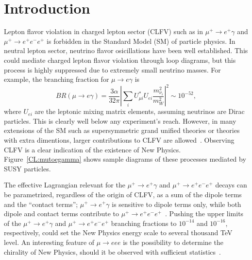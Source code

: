 \section{Introduction}

Lepton flavor violation in charged lepton sector (CLFV) such as in 
$\mu^+\to e^+\gamma$ and $\mu^+\to e^+e^-e^+$ is forbidden in
the Standard Model (SM) of particle physics. In neutral lepton sector,
neutrino flavor osicillations have been well established. This could 
mediate charged lepton flavor violation through loop diagrams, but this
process is highly suppressed due to extremely small neutrino masses. 
For example, the branching fraction for
$\mu \to e \gamma$ is~\cite{}
\begin{equation}
BR(\mu \rightarrow e \gamma)=\frac{3\alpha}{32\pi}\left|\sum_i U_{\mu
i}^* U_{e i}\frac{m_{\nu_{i}}^2}{m_{W}^2}\right|^2 \sim 10^{-52},
\end{equation}
where $U_{ei}$ are the leptonic mixing matrix elements, assuming neutrinos
are Dirac particles. This is clearly well below any experiment's reach.
However, in many extensions of the SM such as supersymmetric grand unified
theories or theories with extra dimentions, larger contributions to CLFV are
allowed~\cite{new physics}. Observing CLFV is a clear indication of the 
existence of New Physics. Figure~\ref{CL:mutoegamma} shows sample diagrams
of these processes mediated by SUSY particles.

The effective Lagrangian relevant for the $\mu^+\to e^+\gamma$ and $\mu^+\to e^+e^-e^+$
decays can be parametrized, regardless of the origin of CLFV, as a sum of
the dipole terms and the ``contact terms''; $\mu^+\to e^+\gamma$ is sensitive to
dipole terms only, while both dipole and contact terms contribute to 
$\mu^+\to e^+e^-e^+$~\cite{deGouvea:2013zba}. Pushing the upper limits of
the $\mu^+\to e^+\gamma$ and $\mu^+\to e^+e^-e^+$ branching fractions 
to $10^{-14}$ and $10^{-16}$, respectively, could set the New Physics energy
scale to several thousand TeV level.
An interesting feature of $\mu \rightarrow eee$ is 
the possibility to determine the chirality of New Physics, should it be 
observed with sufficient statistics~\cite{Okada:1999zk}. 

